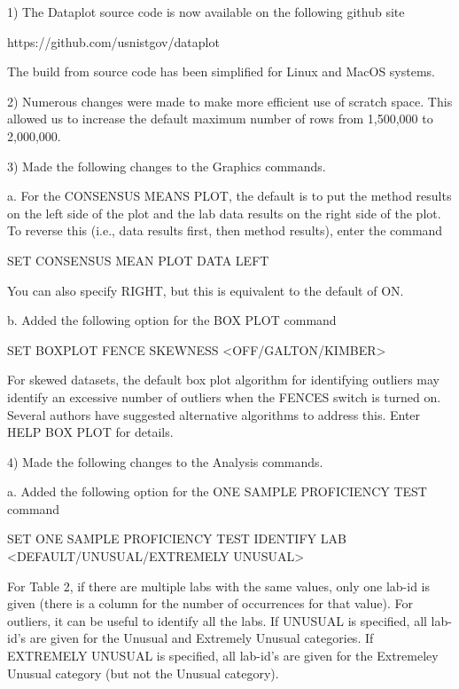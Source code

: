  1) The Dataplot source code is now available on the following
    github site

        https://github.com/usnistgov/dataplot

    The build from source code has been simplified for Linux and
    MacOS systems.

 2) Numerous changes were made to make more efficient use of scratch
    space.  This allowed us to increase the default maximum number of
    rows from 1,500,000 to 2,000,000.

 3) Made the following changes to the Graphics commands.

      a. For the CONSENSUS MEANS PLOT, the default is to put the method
         results on the left side of the plot and the lab data results
         on the right side of the plot.  To reverse this (i.e., data
         results first, then method results), enter the command

            SET CONSENSUS MEAN PLOT DATA LEFT

         You can also specify RIGHT, but this is equivalent to the
         default of ON.

      b. Added the following option for the BOX PLOT command

            SET BOXPLOT FENCE SKEWNESS <OFF/GALTON/KIMBER>

         For skewed datasets, the default box plot algorithm for
         identifying outliers may identify an excessive number of
         outliers when the FENCES switch is turned on.  Several
         authors have suggested alternative algorithms to address
         this.  Enter HELP BOX PLOT for details.

 4) Made the following changes to the Analysis commands.

      a. Added the following option for the ONE SAMPLE PROFICIENCY TEST
         command

            SET ONE SAMPLE PROFICIENCY TEST IDENTIFY LAB
                <DEFAULT/UNUSUAL/EXTREMELY UNUSUAL>

         For Table 2, if there are multiple labs with the same values,
         only one lab-id is given (there is a column for the number of
         occurrences for that value).  For outliers, it can be useful
         to identify all the labs.  If UNUSUAL is specified, all lab-id's
         are given for the Unusual and Extremely Unusual categories.  If
         EXTREMELY UNUSUAL is specified, all lab-id's are given for the
         Extremeley Unusual category (but not the Unusual category).

